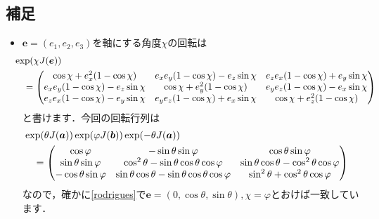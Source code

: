 \documentclass[a4paper,pdflatex,ja=standard]{bxjsarticle}
\begin{document}
\subsection*{補足}
\begin{itemize}
  \item 
  $\bm{e}=(e_1,e_2,e_3)$を軸にする角度$\chi$の回転は
  \begin{align}
    &\hspace*{-10pt}
    \exp(\chi J(\bm{e}))
    \nonumber
    \\
    &=
    \begin{pmatrix}
      \cos\chi
      +
      e_x^2(1-\cos\chi)
      &
      e_xe_y(1-\cos\chi)
      -
      e_z\sin\chi
      &
      e_ze_x(1-\cos\chi)
      +
      e_y\sin\chi
      \\
      e_xe_y(1-\cos\chi)
      -
      e_z\sin\chi
      &
      \cos\chi
      +
      e_y^2(1-\cos\chi)
      &
      e_ye_z(1-\cos\chi)
      -
      e_x\sin\chi
      \\
      e_ze_x(1-\cos\chi)
      -
      e_y\sin\chi
      &
      e_ye_z(1-\cos\chi)
      +
      e_x\sin\chi
      &
      \cos\chi
      +
      e_z^2(1-\cos\chi)
    \end{pmatrix}
    \label{rodrigues}
  \end{align}
  と書けます．今回の回転行列は
  \begin{align}
    &\hspace*{-10pt}
    \exp(\theta J(\bm{a}))\exp(\varphi J(\bm{b}))\exp(-\theta J(\bm{a}))
    \nonumber
    \\
    &=
    \begin{pmatrix}
      \cos\varphi
      &
      -\sin\theta\sin\varphi
      &
      \cos\theta\sin\varphi
      \\
      \sin\theta\sin\varphi
      &
      \cos^2\theta-\sin\theta\cos\theta\cos\varphi
      &
      \sin\theta\cos\theta-\cos^2\theta\cos\varphi
      \\
      -\cos\theta\sin\varphi
      &
      \sin\theta\cos\theta-\sin\theta\cos\theta\cos\varphi
      &
      \sin^2\theta
      +
      \cos^2\theta\cos\varphi
    \end{pmatrix}
  \end{align}
  なので，確かに\eqref{rodrigues}で$\bm{e}=(0,\cos\theta,\sin\theta), \chi=\varphi$とおけば一致しています．

\end{itemize}



\clearpage
\end{document}
